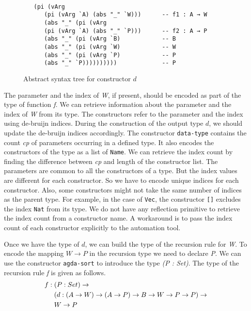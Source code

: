 \documentclass[sigplan,10pt]{acmart}
\begin{document}
\begin{figure}
\begin{center}
\begingroup
\fontsize{7pt}{9pt}\selectfont
\begin{Verbatim}[frame = single]

   (pi (vArg 
      (pi (vArg `A) (abs "_" `W)))      -- f1 : A → W
      (abs "_" (pi (vArg 
      (pi (vArg `A) (abs "_" `P)))      -- f2 : A → P
      (abs "_" (pi (vArg `B)            -- B
      (abs "_" (pi (vArg `W)            -- W
      (abs "_" (pi (vArg `P)            -- P
      (abs "_" `P))))))))))             -- P

\end{Verbatim}
\endgroup
\end{center}
\caption{Abstract syntax tree for constructor $d$}
\label{fig:ast-d}
\end{figure}

\normalsize

The parameter and the index of \emph{W}, if present, should be encoded as part of the type of function \emph{f}. We can retrieve information about the parameter and the index of \emph{W} from its type. The constructors refer to the parameter and the index using de-bruijn indices. During the construction of the output type $d$, we should update the de-bruijn indices accordingly. The constructor {\tt data-type} contains the count \emph{cp} of parameters occurring in a defined type. It also encodes the constructors of the type as a list of {\tt Name}. We can retrieve the index count by finding the difference between \emph{cp} and length of the constructor list. The parameters are common to all the constructors of a type. But the index values are different for each constructor. So we have to encode unique indices for each constructor. Also, some constructors might not take the same number of indices as the parent type. For example, in the case of {\tt Vec}, the constructor {\tt []} excludes the index {\tt Nat} from its type. We do not have any reflection primitive to retrieve the index count from a constructor name. A workaround is to pass the index count of each constructor explicitly to the automation tool.

Once we have the type of $d$, we can build the type of the recursion rule for \emph{W}. To encode the mapping $W \rightarrow P$ in the recursion type we need to declare \emph{P}. We can use the constructor {\tt agda-sort} to introduce the type \emph{(P : Set)}. The type of the recursion rule \emph{f} is given as follows.
\begin{align}
& f : (P : Set) \rightarrow  \nonumber \\
& \hspace {0.5cm} (d : (A \rightarrow W) \rightarrow (A \rightarrow P) \rightarrow B \rightarrow W \rightarrow P \rightarrow P) \rightarrow \nonumber \\  
& \hspace {0.5cm} W \rightarrow P \nonumber
\end{align}
 
\end{document}
